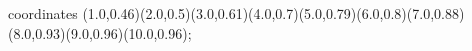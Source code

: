 					coordinates { (1.0,0.46)(2.0,0.5)(3.0,0.61)(4.0,0.7)(5.0,0.79)(6.0,0.8)(7.0,0.88)(8.0,0.93)(9.0,0.96)(10.0,0.96)};